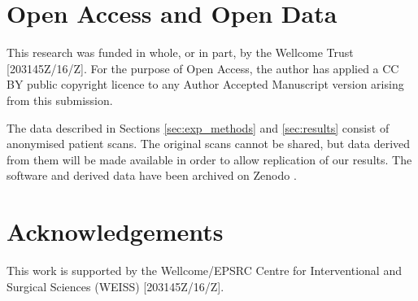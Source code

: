 \section{Open Access and Open Data}
This research was funded in whole, or in part, by the Wellcome Trust [203145Z/16/Z]. 
For the purpose of Open Access, the author has applied a CC BY public copyright licence to any Author Accepted Manuscript version arising from this submission.

The data described in Sections \ref{sec:exp_methods} and \ref{sec:results} consist 
of anonymised patient scans. The original scans cannot be shared, but 
data derived from them will be made available in order to allow replication 
of our results. The software and derived data have been archived on Zenodo \cite{olafsdottir2022}.

\section{Acknowledgements}
This work is supported by the Wellcome/EPSRC Centre for Interventional and Surgical Sciences (WEISS) [203145Z/16/Z].


